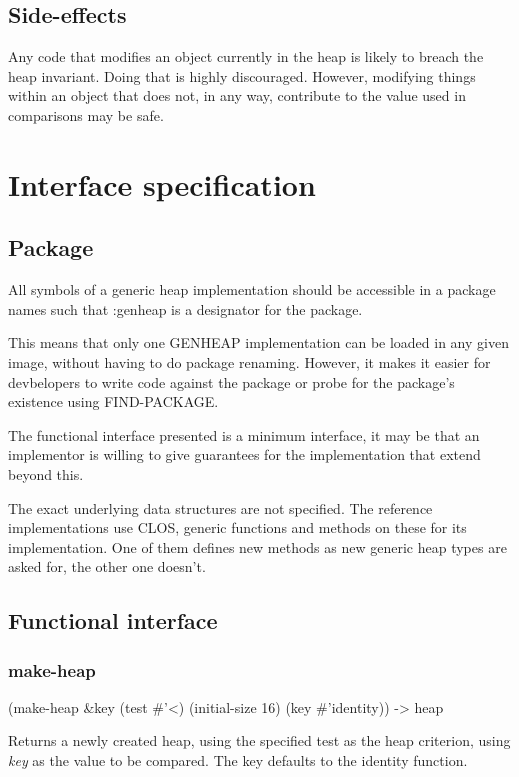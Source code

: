 \documentclass{report}
\begin{document}
\subsection{Side-effects}

Any code that modifies an object currently in the heap is likely to
breach the heap invariant. Doing that is highly discouraged. However,
modifying things within an object that does not, in any way,
contribute to the value used in comparisons may be safe.
 
\section{Interface specification}
 \subsection{Package}
 All symbols of a generic heap implementation should be accessible in
 a package names such that :genheap is a designator for the
 package.

 This means that only one GENHEAP implementation can be loaded in any
 given image, without having to do package renaming. However, it makes
 it easier for devbelopers to write code against the package or probe
 for the package's existence using FIND-PACKAGE.

 The functional interface presented is a minimum interface, it may be
 that an implementor is willing to give guarantees for the
 implementation that extend beyond this.

 The exact underlying data structures are not specified. The reference
 implementations use CLOS, generic functions and methods on these for
 its implementation. One of them defines new methods as new generic
 heap types are asked for, the other one doesn't.

 \subsection{Functional interface}
 \subsubsection{make-heap}
   (make-heap \&key (test #'<) (initial-size 16) (key \#'identity)) -> heap

 Returns a newly created heap, using the specified test as the heap
 criterion, using {\sl key} as the value to be compared. The key
 defaults to the identity function.
\end{document}
